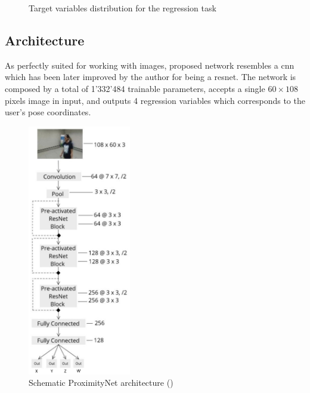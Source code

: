 \begin{figure}[!h]
\begin{center}
\begin{subfigure}[h]{0.24\textwidth}
		\end{subfigure}
	\end{center}
	\vspace{-0.5cm}
	\caption[Target variables distribution for the regression task]{Target variables distribution for the regression task}
	\label{fig:proximitynet-dataset-distribution-regr}
\end{figure}



\subsection{Architecture}
\label{subsec:proximitynet-architecture}


As perfectly suited for working with images, proposed network resembles a \gls{cnn} which has been later improved by the author for being a \gls{resnet}. The network is composed by a total of 1'332'484 trainable parameters, accepts a single $60 \times 108$ pixels image in input, and outputs 4 regression variables which corresponds to the user's pose coordinates.

\begin{figure}[!h]
	\centering
	\includegraphics[width=0.4\textwidth]{"contents/images/03-proximitynet-1A"}
	\caption[Schematic ProximityNet architecture]{Schematic ProximityNet architecture (\cite{mantegazza2019visionbased})}
	\label{fig:proximitynet-architecture-1}
\end{figure}

